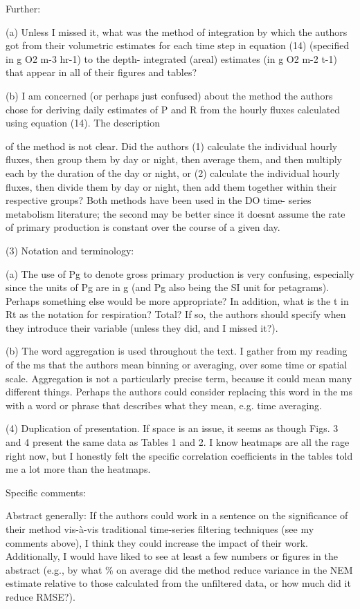 \documentclass[letterpaper,12pt]{article}\usepackage[]{graphicx}\usepackage[]{color}
\begin{document}
Further:

(a) Unless I missed it, what was the method of integration by which the authors got from their volumetric estimates for each time step in equation (14) (specified in g O2 m-3 hr-1) to the depth- integrated (areal) estimates (in g O2 m-2 t-1) that appear in all of their figures and tables?

(b) I am concerned (or perhaps just confused) about the method the authors chose for deriving daily estimates of P and R from the hourly fluxes calculated using equation (14). The description
 
of the method is not clear. Did the authors (1) calculate the individual hourly fluxes, then group them by day or night, then average them, and then multiply each by the duration of the day or night, or (2) calculate the individual hourly fluxes, then divide them by day or night, then add them together within their respective groups? Both methods have been used in the DO time- series metabolism literature; the second may be better since it doesnt assume the rate of primary production is constant over the course of a given day.

(3) Notation and terminology:

(a) The use of Pg to denote gross primary production is very confusing, especially since the units of Pg are in g (and Pg also being the SI unit for petagrams). Perhaps something else would be more appropriate? In addition, what is the t in Rt as the notation for respiration? Total? If so, the authors should specify when they introduce their variable (unless they did, and I missed it?).

(b) The word aggregation is used throughout the text. I gather from my reading of the ms that the authors mean binning or averaging, over some time or spatial scale. Aggregation is not a particularly precise term, because it could mean many different things. Perhaps the authors could consider replacing this word in the ms with a word or phrase that describes what they mean, e.g. time averaging.

(4) Duplication of presentation. If space is an issue, it seems as though Figs. 3 and 4 present the same data as Tables 1 and 2. I know heatmaps are all the rage right now, but I honestly felt the specific correlation coefficients in the tables told me a lot more than the heatmaps.

Specific comments:

Abstract generally: If the authors could work in a sentence on the significance of their method vis-à-vis traditional time-series filtering techniques (see my comments above), I think they could increase the impact of their work. Additionally, I would have liked to see at least a few numbers or figures in the abstract (e.g., by what \% on average did the method reduce variance in the NEM estimate relative to those calculated from the unfiltered data, or how much did it reduce
RMSE?).
\end{document}
